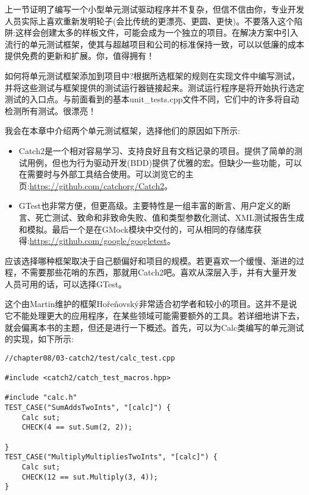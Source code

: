 
上一节证明了编写一个小型单元测试驱动程序并不复杂，但信不信由你，专业开发人员实际上喜欢重新发明轮子(会比传统的更漂亮、更圆、更快)。不要落入这个陷阱:这样会创建太多的样板文件，可能会成为一个独立的项目。在解决方案中引入流行的单元测试框架，使其与超越项目和公司的标准保持一致，可以以低廉的成本提供免费的更新和扩展。你，值得拥有！

如何将单元测试框架添加到项目中?根据所选框架的规则在实现文件中编写测试，并将这些测试与框架提供的测试运行器链接起来。测试运行程序是将开始执行选定测试的入口点。与前面看到的基本unit\_tests.cpp文件不同，它们中的许多将自动检测所有测试。很漂亮！

我会在本章中介绍两个单元测试框架，选择他们的原因如下所示:

\begin{itemize}
\item 
Catch2是一个相对容易学习、支持良好且有文档记录的项目。提供了简单的测试用例，但也为行为驱动开发(BDD)提供了优雅的宏。但缺少一些功能，可以在需要时与外部工具结合使用。可以浏览它的主页:\url{https://github.com/catchorg/Catch2}。

\item 
GTest也非常方便，但更高级。主要特性是一组丰富的断言、用户定义的断言、死亡测试、致命和非致命失败、值和类型参数化测试、XML测试报告生成和模拟。最后一个是在GMock模块中交付的，可从相同的存储库获得:\url{https://github.com/google/googletest}。
\end{itemize}

应该选择哪种框架取决于自己额偏好和项目的规模。若更喜欢一个缓慢、渐进的过程，不需要那些花哨的东西，那就用Catch2吧。喜欢从深层入手，并有大量开发人员可用的话，可以选择GTest。


这个由Martin维护的框架Hořeňovský非常适合初学者和较小的项目。这并不是说它不能处理更大的应用程序，在某些领域可能需要额外的工具。若详细地讲下去，就会偏离本书的主题，但还是进行一下概述。首先，可以为Calc类编写的单元测试的实现，如下所示:

\begin{lstlisting}[style=styleCXX]
//chapter08/03-catch2/test/calc_test.cpp

#include <catch2/catch_test_macros.hpp>

#include "calc.h"
TEST_CASE("SumAddsTwoInts", "[calc]") {
	Calc sut;
	CHECK(4 == sut.Sum(2, 2));

}
TEST_CASE("MultiplyMultipliesTwoInts", "[calc]") {
	Calc sut;
	CHECK(12 == sut.Multiply(3, 4));
}
\end{lstlisting} 

